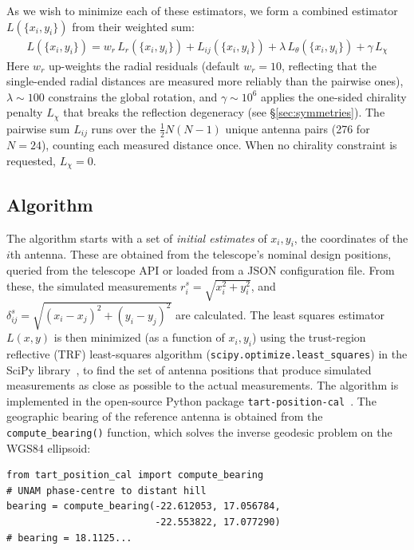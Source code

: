 \documentclass[twocolumn, a4paper,10pt]{article}
\begin{document}
As we wish to minimize each of these estimators, we form a combined estimator $L(\{x_i, y_i\})$ from their weighted sum:
\begin{align}
	L(\{x_i, y_i\}) = w_r\, L_r(\{x_i, y_i\}) + L_{ij}(\{x_i, y_i\}) + \lambda\, L_\theta(\{x_i, y_i\}) + \gamma\, L_\chi
\end{align}
Here $w_r$ up-weights the radial residuals (default $w_r = 10$, reflecting that the single-ended radial distances are measured more reliably than the pairwise ones), $\lambda \sim 100$ constrains the global rotation, and $\gamma \sim 10^6$ applies the one-sided chirality penalty $L_\chi$ that breaks the reflection degeneracy (see \S\ref{sec:symmetries}). The pairwise sum $L_{ij}$ runs over the $\tfrac{1}{2}N(N-1)$ unique antenna pairs (276 for $N=24$), counting each measured distance once. When no chirality constraint is requested, $L_\chi = 0$.

\subsection{Algorithm}

The algorithm starts with a set of \emph{initial estimates} of $x_i, y_i$, the coordinates of the $i$th antenna. These are obtained from the telescope's nominal design positions, queried from the telescope API or loaded from a JSON configuration file. From these, the simulated measurements $r^s_i = \sqrt{x_i^2 + y_i^2}$, and $\delta^s_{ij} = \sqrt{(x_i - x_j)^2 + (y_i - y_j)^2}$ are calculated. The least squares estimator $L(x,y)$ is then minimized (as a function of $x_i, y_i$) using the trust-region reflective (TRF) least-squares algorithm (\texttt{scipy.optimize.least\_squares}) in the SciPy library~\cite{scipy}, to find the set of antenna positions that produce simulated measurements as close as possible to the actual measurements. The algorithm is implemented in the open-source Python package \texttt{tart-position-cal}~\cite{moltento2026tartpositioncal}.  The geographic bearing of the reference antenna is obtained from the \texttt{compute\_bearing()} function, which solves the inverse geodesic problem on the WGS84 ellipsoid:

\begin{verbatim}
from tart_position_cal import compute_bearing
# UNAM phase-centre to distant hill
bearing = compute_bearing(-22.612053, 17.056784,
                          -22.553822, 17.077290)
# bearing = 18.1125...
\end{verbatim}
\end{document}
